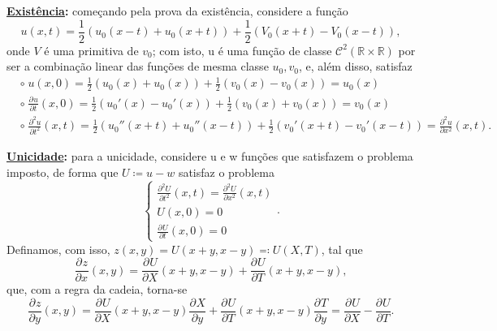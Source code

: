 \documentclass[../pde_notes.tex]{subfiles}
\begin{document}
\begin{proof*}
	\textbf{\underline{Existência}:} começando pela prova da existência, considere a função
	\[
		u(x, t) = \frac{1}{2}(u_{0}(x-t) + u_{0}(x+t)) + \frac{1}{2}(V_{0}(x+t) - V_{0}(x-t)),
	\]
	onde \(V\) é uma primitiva de \(v_{0}\); com isto, u é uma função de classe \(\mathcal{C}^{2}(\mathbb{R}\times \mathbb{R})\) por ser a combinação linear das funções de mesma classe \(u_{0}, v_{0}\), e, além disso, satisfaz
	\begin{align*}
		 & \circ\; u(x, 0) = \frac{1}{2}(u_{0}(x) + u_{0}(x)) + \frac{1}{2}(v_{0}(x) - v_{0}(x)) = u_{0}(x)                                                                                     \\
		 & \circ\; \frac{\partial^{}u}{\partial t^{}}(x, 0) = \frac{1}{2}(u_{0}'(x) - u_{0}'(x)) + \frac{1}{2}(v_{0}(x)+v_{0}(x)) = v_{0}(x)                                                    \\
		 & \circ\; \frac{\partial^{2}u}{\partial t^{2}}(x, t) = \frac{1}{2}(u_{0}''(x+t) + u_{0}''(x-t)) + \frac{1}{2}(v_{0}'(x+t) - v_{0}'(x-t)) = \frac{\partial^{2}u}{\partial x^{2}}(x, t).
	\end{align*}

	\textbf{\underline{Unicidade}:} para a unicidade, considere u e w funções que satisfazem o problema imposto, de forma que \(U\coloneqq u-w\) satisfaz o problema
	\[
		\left\{\begin{array}{ll}
			\frac{\partial^{2}U}{\partial t^{2}}(x, t) = \frac{\partial^{2}U}{\partial x^{2}}(x, t) \\
			U(x, 0) = 0                                                                             \\
			\frac{\partial^{}U}{\partial t^{}}(x, 0) = 0
		\end{array}\right..
	\]
	Definamos, com isso, \(z(x, y) = U(x+y, x-y) \eqqcolon U(X, T)\), tal que
	\[
		\frac{\partial^{}z}{\partial x^{}}(x, y) = \frac{\partial^{}U}{\partial X^{}}(x+y, x-y) + \frac{\partial^{}U}{\partial T^{}}(x+y, x-y),
	\]
	que, com a regra da cadeia, torna-se
	\[
		\frac{\partial^{}z}{\partial y^{}}(x, y) = \frac{\partial^{}U}{\partial X^{}}(x+y, x-y)\frac{\partial^{}X}{\partial y^{}} + \frac{\partial^{}U}{\partial T^{}}(x+y, x-y)\frac{\partial^{}T}{\partial y^{}} = \frac{\partial^{}U}{\partial X^{}} - \frac{\partial^{}U}{\partial T^{}}.
	\]


\end{proof*}
\end{document}
